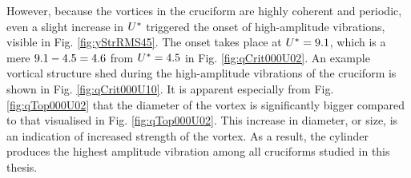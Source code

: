 \documentclass[oneside]{utmthesis}
\begin{document}
However, because the vortices in the \angon{} cruciform are highly coherent and periodic, even a slight increase in $U^{*}$ triggered the onset of high-amplitude vibrations, visible in Fig. \ref{fig:yStrRMS45}. The onset takes place at $U^{*} = 9.1$, which is a mere $9.1 - 4.5 = 4.6$ from $U^{*} = 4.5$ in Fig. \ref{fig:qCrit000U02}. An example vortical structure shed during the high-amplitude vibrations of the \angon{} cruciform is shown in Fig. \ref{fig:qCrit000U10}. It is apparent especially from Fig. \ref{fig:qTop000U02} that the diameter of the vortex is significantly bigger compared to that visualised in Fig. \ref{fig:qTop000U02}. This increase in diameter, or size, is an indication of increased strength of the vortex. As a result, the cylinder produces the highest amplitude vibration among all cruciforms studied in this thesis.
\end{document}
